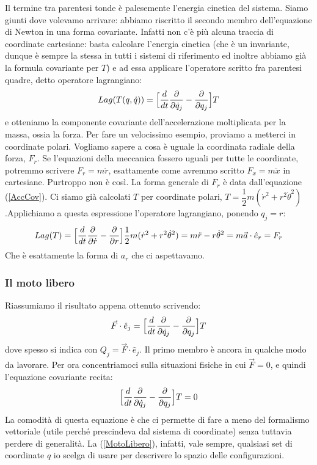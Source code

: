 \documentclass[a4paper,openany]{article}
\begin{document}
	Il termine tra parentesi tonde è palesemente l'energia cinetica del sistema. Siamo giunti dove volevamo arrivare: abbiamo riscritto il secondo membro dell'equazione di Newton in una forma covariante. Infatti non c'è più alcuna traccia di coordinate cartesiane: basta calcolare l'energia cinetica (che è un invariante, dunque è sempre la stessa in tutti i sistemi di riferimento ed inoltre abbiamo già la formula covariante per $T$) e ad essa applicare l'operatore scritto fra parentesi quadre, detto operatore lagrangiano:
	$$
	Lag(T(q,\dot{q})) =  \Bigl[\dfrac{d}{dt}\dfrac{\partial }{\partial \dot{q}_{j}}-\dfrac{\partial }{\partial q_{j}}\Bigl]T
	$$
	e otteniamo la componente covariante dell'accelerazione moltiplicata per la massa, ossia la forza. Per fare un velocissimo esempio, proviamo a metterci in coordinate polari. Vogliamo sapere a cosa è uguale la coordinata radiale della forza, $F_{r}$. Se l'equazioni della meccanica fossero uguali per tutte le coordinate, potremmo scrivere $F_{r} = m\ddot{r}$, esattamente come avremmo scritto $F_{x} = m\ddot{x}$ in cartesiane. Purtroppo non è così. La forma generale di $F_{r}$ è data dall'equazione (\ref{AccCov}). Ci siamo già calcolati $T$ per coordinate polari, $T = \dfrac{1}{2}m(\dot{r}^{2}+r^{2}\dot{\theta}^{2})$.Applichiamo a questa espressione l'operatore lagrangiano, ponendo $q_{j} = r$:
	$$
	Lag(T) =   \Bigl[\dfrac{d}{dt}\dfrac{\partial }{\partial \dot{r}}-\dfrac{\partial }{\partial r}\Bigl] \dfrac{1}{2}m(\dot{r}^{2}+r^{2}\dot{\theta}^{2}) = m\ddot{r} - r\dot{\theta}^{2} = m\vec{a}\cdot\hat{e}_{r} = F_{r}
	$$
	Che è esattamente la forma di $a_{r}$ che ci aspettavamo.
	\subsubsection{Il moto libero}
	Riassumiamo il risultato appena ottenuto scrivendo:
	\begin{equation}
		\vec{F}\cdot\hat{e}_{j} =  \Bigl[\dfrac{d}{dt}\dfrac{\partial }{\partial \dot{q}_{j}}-\dfrac{\partial }{\partial q_{j}}\Bigl]T
	\end{equation}
	dove spesso si indica con $Q_{j} = \vec{F}\cdot\hat{e}_{j}$. Il primo membro è ancora in qualche modo da lavorare. Per ora concentriamoci sulla situazioni fisiche in cui $\vec{F}=0$, e quindi l'equazione covariante recita:
	\begin{equation}
		\Bigl[\dfrac{d}{dt}\dfrac{\partial }{\partial \dot{q}_{j}}-\dfrac{\partial }{\partial q_{j}}\Bigl]T = 0
		\label{MotoLibero}
	\end{equation}
	La comodità di questa equazione è che ci permette di fare a meno del formalismo vettoriale (utile perché prescindeva dal sistema di coordinate) senza tuttavia perdere di generalità. La (\ref{MotoLibero}), infatti, vale sempre, qualsiasi set di coordinate $q$ io scelga di usare per descrivere lo spazio delle configurazioni.
	
\end{document}
